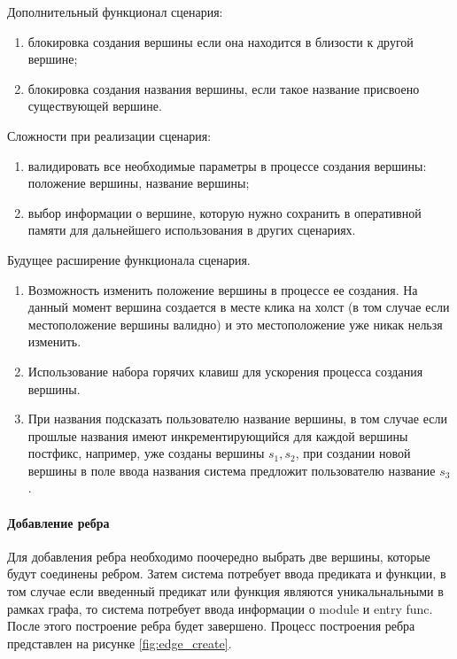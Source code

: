Дополнительный функционал сценария:
\begin{enumerate}[label=\arabic*)]
	\item блокировка создания вершины если она находится в близости к другой вершине;
	\item блокировка создания названия вершины, если такое название присвоено существующей вершине.
\end{enumerate}

Сложности при реализации сценария:
\begin{enumerate}[label=\arabic*)]
	\item валидировать все необходимые параметры в процессе создания вершины: положение вершины, название вершины;
	\item выбор информации о вершине, которую нужно сохранить в оперативной памяти для дальнейшего использования в других сценариях.
\end{enumerate}

Будущее расширение функционала сценария.
\begin{enumerate}[label=\arabic*)]
	\item Возможность изменить положение вершины в процессе ее создания. На данный момент вершина создается в месте клика на холст (в том случае если местоположение вершины валидно) и это местоположение уже никак нельзя изменить.
	\item Использование набора горячих клавиш для ускорения процесса создания вершины.
	\item При названия подсказать пользователю название вершины, в том случае если прошлые названия имеют инкрементирующийся для каждой вершины постфикс, например, уже созданы вершины $s_1, s_2$, при создании новой вершины в поле ввода названия система предложит пользователю название $s_3$.
\end{enumerate}

\paragraph{Добавление ребра}

Для добавления ребра необходимо поочередно выбрать две вершины, которые будут соединены ребром. Затем система потребует ввода предиката и функции, в том случае если введенный предикат или функция являются уникальнальными в рамках графа, то система потребует ввода информации о module и entry func. После этого построение ребра будет завершено. Процесс построения ребра представлен на рисунке \ref{fig:edge_create}.

